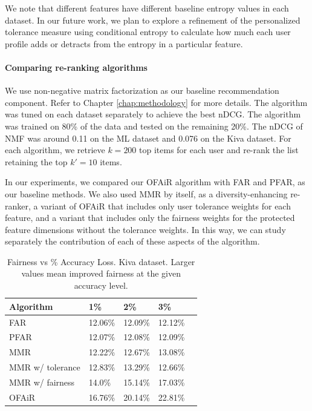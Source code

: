 We note that different features have different baseline entropy values in each dataset. In our future work, we plan to explore a refinement of the personalized tolerance measure using conditional entropy to calculate how much each user profile adds or detracts from the entropy in a particular feature.


\noindent\paragraph{\textbf{Comparing re-ranking algorithms}}
\newline
\indent We use non-negative matrix factorization as our baseline recommendation component. Refer to Chapter \ref{chap:methodology} for more details. The algorithm was tuned on each dataset separately to achieve the best nDCG. The algorithm was trained on 80\% of the data and tested on the remaining 20\%. The nDCG of NMF was around 0.11 on the ML dataset and 0.076 on the Kiva dataset.
For each algorithm, we retrieve $k=200$ top items for each user and re-rank the list retaining the top $k'=10$ items.  

In our experiments, we compared our OFAiR algorithm with FAR and PFAR, as our baseline methods. We also used MMR by itself, as a diversity-enhancing re-ranker, a variant of OFAiR that includes only user tolerance weights for each feature, and a variant that includes only the fairness weights for the protected feature dimensions without the tolerance weights. In this way, we can study separately the contribution of each of these aspects of the algorithm.

\begin{table}[]
\centering
\begin{tabular}{lllll}
 Algorithm &  1\% & 2\% & 3\% \\
 \hline
 FAR & 12.06\% & 12.09\% & 12.12\% \\
 PFAR & 12.07\% & 12.08\% & 12.09\% \\
 MMR &  12.22\% & 12.67\% & 13.08\% \\
 MMR w/ tolerance & 12.83\% & 13.29\% & 12.66\%   \\
 MMR w/ fairness & 14.0\% & 15.14\% & 17.03\%  \\
 OFAiR & 16.76\% & 20.14\% & 22.81\% \\
 \hline
\end{tabular}
\caption{Fairness vs \% Accuracy Loss. Kiva dataset. 
Larger values mean improved fairness at the given accuracy level.}
\label{tbl:kiva_fairness_accuracy_relationship}
\end{table}

